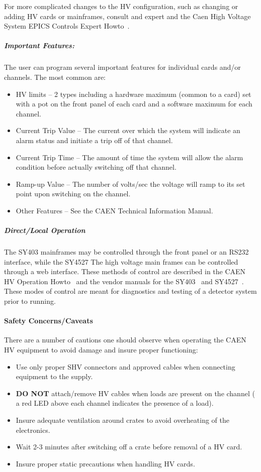 {For more complicated changes to the HV configuration, such as changing or
adding HV cards or mainframes, consult and expert and the Caen High
Voltage System EPICS Controls Expert Howto~\cite{howto:CAEN_HV_expert}.

\subparagraph{Important Features:}

The user can program several important features for individual
cards and/or channels.  The most common are:

\begin{itemize}
\item{HV limits -- 2 types including a hardware maximum (common to a
card) set with a pot on the front panel of each card and a software
maximum for each channel.}
\item{Current Trip Value -- The current over which the system will
indicate an alarm status and initiate a trip off of that channel.}
\item{Current Trip Time -- The amount of time the system will allow
the alarm condition before actually switching off that channel.}
\item{Ramp-up Value -- The number of volts/sec the voltage will ramp
to its set point upon switching on the channel.}
\item{Other Features -- See the CAEN Technical Information Manual.}
\end{itemize}

\subparagraph{Direct/Local Operation}
The SY403 mainframes may be controlled through the front panel or an
RS232 interface, while the SY4527 The high voltage main frames can be
controlled through a web interface.   These methods of control are
described in the CAEN HV Operation
Howto~\cite{howto:CAEN_HV_operation} and the vendor manuals for the
SY403~\cite{caensy403manual} and SY4527~\cite{caensy4527manual}.
These modes of control are meant for
diagnostics and testing of a detector system prior to running.

\paragraph{Safety Concerns/Caveats}

There are a number of cautions one should observe when operating
the CAEN HV equipment to avoid damage and insure proper functioning:

\begin{itemize}
\item{Use only proper SHV connectors and approved cables when
connecting equipment to the supply.}
\item{{\bf DO NOT} attach/remove HV cables when loads are present on the
channel ( a red LED above each channel indicates the presence of a
load).}
\item{Insure adequate ventilation around crates to avoid overheating
of the electronics.}
\item{Wait 2-3 minutes after switching off a crate before removal of a
HV card.}
\item{Insure proper static precautions when handling HV cards.}
\end{itemize}

}
